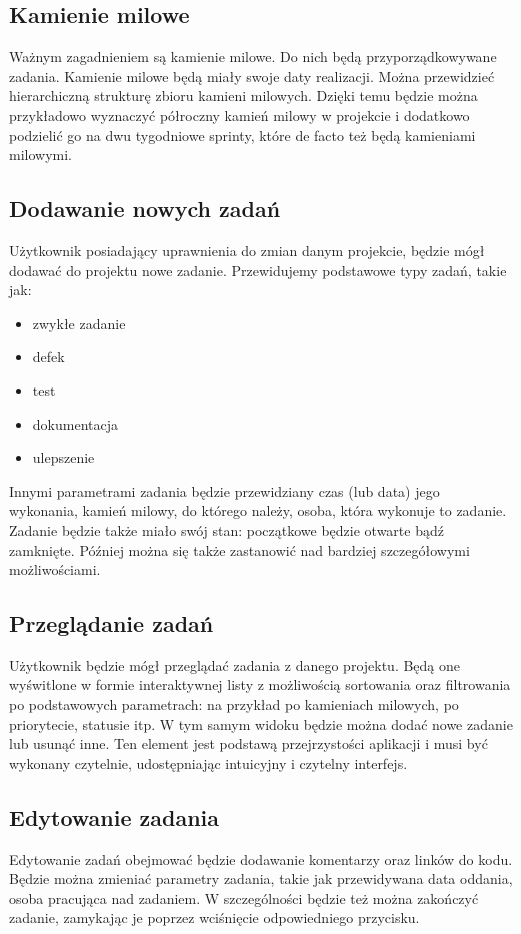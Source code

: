 \documentclass[a4paper,12pt,notitlepage]{mwrep}
\begin{document}
\subsection{Kamienie milowe}
Ważnym zagadnieniem są kamienie milowe. Do nich będą przyporządkowywane zadania.
Kamienie milowe będą miały swoje daty realizacji. Można przewidzieć hierarchiczną
strukturę zbioru kamieni milowych. Dzięki temu będzie można przykładowo wyznaczyć
półroczny kamień milowy w projekcie i dodatkowo podzielić go na dwu tygodniowe
sprinty, które de facto też będą kamieniami milowymi.

\subsection{Dodawanie nowych zadań}
Użytkownik posiadający uprawnienia do zmian danym projekcie,
będzie mógł dodawać do projektu nowe zadanie. Przewidujemy podstawowe typy zadań, takie jak: 
\begin{itemize}
	\item	zwykłe zadanie
	\item	defek
	\item	test
	\item	dokumentacja
	\item	ulepszenie
\end{itemize}
Innymi parametrami zadania będzie przewidziany czas (lub data) jego wykonania,
kamień milowy, do którego należy, osoba, która wykonuje to zadanie.
Zadanie będzie także miało swój stan: początkowe będzie otwarte bądź zamknięte.
Później można się także zastanowić nad bardziej szczegółowymi możliwościami.

\subsection{Przeglądanie zadań}
Użytkownik będzie mógł przeglądać zadania z danego projektu.
Będą one wyświtlone w formie interaktywnej listy z możliwością sortowania
oraz filtrowania po podstawowych parametrach: na przykład po kamieniach milowych,
po priorytecie, statusie itp. W tym samym widoku będzie można dodać nowe zadanie
lub usunąć inne. Ten element jest podstawą przejrzystości aplikacji i musi
być wykonany czytelnie, udostępniając intuicyjny i czytelny interfejs.

\subsection{Edytowanie zadania}
Edytowanie zadań obejmować będzie dodawanie komentarzy oraz linków do kodu.
Będzie można zmieniać parametry zadania, takie jak przewidywana data oddania,
osoba pracująca nad zadaniem. W szczególności będzie też można zakończyć zadanie,
zamykając je poprzez wciśnięcie odpowiedniego przycisku.
\end{document}
